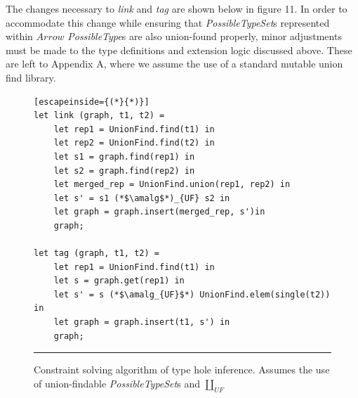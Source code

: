 The changes necessary to \textit{link} and \textit{tag} are shown below in figure 11. In order to accommodate this change while ensuring that \textit{PossibleTypeSet}s represented within $Arrow$ \textit{PossibleType}s are also union-found properly, minor adjustments must be made to the type definitions and extension logic discussed above. These are left to Appendix A, where we assume the use of a standard mutable union find library.



\begin{figure}[htbp]
\begin{lstlisting}[escapeinside={(*}{*)}]
let link (graph, t1, t2) =
    let rep1 = UnionFind.find(t1) in
    let rep2 = UnionFind.find(t2) in
    let s1 = graph.find(rep1) in
    let s2 = graph.find(rep2) in 
    let merged_rep = UnionFind.union(rep1, rep2) in
    let s' = s1 (*$\amalg$*)_{UF} s2 in
    let graph = graph.insert(merged_rep, s')in
    graph;

let tag (graph, t1, t2) =
    let rep1 = UnionFind.find(t1) in
    let s = graph.get(rep1) in
    let s' = s (*$\amalg_{UF}$*) UnionFind.elem(single(t2)) in
    let graph = graph.insert(t1, s') in 
    graph;
\end{lstlisting}
\vspace{-4px}
 \hrule
\caption{Constraint solving algorithm of type hole inference. Assumes the use of union-findable \textit{PossibleTypeSet}s and $\amalg_{UF}$}
\label{fig:algcode}
\end{figure}



